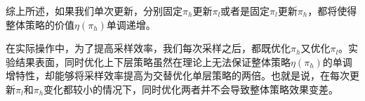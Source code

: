 \documentclass[degree=bachelor, tocarialchapter, pifootnote]{thuthesis}
\begin{document}

综上所述，如果我们单次更新，分别固定$\pi_h$更新$\pi_l$或者是固定$\pi_l$更新$\pi_h$，都将使得整体策略的价值$\eta(\pi_h)$单调递增。

在实际操作中，为了提高采样效率，我们每次采样之后，都既优化$\pi_h$又优化$\pi_l$。实验结果表面，同时优化上下层策略虽然在理论上无法保证整体策略$\eta(\pi_h)$的单调增特性，却能够将采样效率提高为交替优化单层策略的两倍。也就是说，在每次更新$\pi_l$和$\pi_h$变化都较小的情况下，同时优化两者并不会导致整体策略效果变差。

\backmatter




% 

\end{document}
